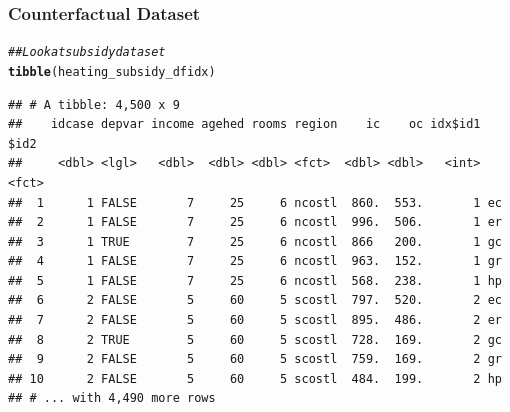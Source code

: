 \documentclass{beamer}\usepackage[]{graphicx}\usepackage[]{color}
\makeatletter
\newcommand{\hlnum}[1]{\textcolor[rgb]{0.686,0.059,0.569}{#1}}%
\newcommand{\hlstr}[1]{\textcolor[rgb]{0.192,0.494,0.8}{#1}}%
\newcommand{\hlcom}[1]{\textcolor[rgb]{0.678,0.584,0.686}{\textit{#1}}}%
\newcommand{\hlopt}[1]{\textcolor[rgb]{0,0,0}{#1}}%
\newcommand{\hlstd}[1]{\textcolor[rgb]{0.345,0.345,0.345}{#1}}%
\newcommand{\hlkwb}[1]{\textcolor[rgb]{0.69,0.353,0.396}{#1}}%
\newcommand{\hlkwc}[1]{\textcolor[rgb]{0.333,0.667,0.333}{#1}}%
\newcommand{\hlkwd}[1]{\textcolor[rgb]{0.737,0.353,0.396}{\textbf{#1}}}%
\newenvironment{kframe}{%
 \def\at@end@of@kframe{}%
 \ifinner\ifhmode%
  \def\at@end@of@kframe{\end{minipage}}%
  \begin{minipage}{\columnwidth}%
 \fi\fi%
 \def\FrameCommand##1{\hskip\@totalleftmargin \hskip-\fboxsep
 \colorbox{shadecolor}{##1}\hskip-\fboxsep
     \hskip-\linewidth \hskip-\@totalleftmargin \hskip\columnwidth}%
 \MakeFramed {\advance\hsize-\width
   \@totalleftmargin\z@ \linewidth\hsize
   \@setminipage}}%
 {\par\unskip\endMakeFramed%
 \at@end@of@kframe}
\newenvironment{knitrout}{}{} %
\makeatother
\begin{document}

\begin{frame}[fragile]\frametitle{Counterfactual Dataset}
\begin{knitrout}\footnotesize
{}\color{fgcolor}\begin{kframe}
\begin{alltt}
\hlcom{## Look at subsidy dataset}
\hlkwd{tibble}\hlstd{(heating_subsidy_dfidx)}
\end{alltt}
\begin{verbatim}
## # A tibble: 4,500 x 9
##    idcase depvar income agehed rooms region    ic    oc idx$id1 $id2 
##     <dbl> <lgl>   <dbl>  <dbl> <dbl> <fct>  <dbl> <dbl>   <int> <fct>
##  1      1 FALSE       7     25     6 ncostl  860.  553.       1 ec   
##  2      1 FALSE       7     25     6 ncostl  996.  506.       1 er   
##  3      1 TRUE        7     25     6 ncostl  866   200.       1 gc   
##  4      1 FALSE       7     25     6 ncostl  963.  152.       1 gr   
##  5      1 FALSE       7     25     6 ncostl  568.  238.       1 hp   
##  6      2 FALSE       5     60     5 scostl  797.  520.       2 ec   
##  7      2 FALSE       5     60     5 scostl  895.  486.       2 er   
##  8      2 TRUE        5     60     5 scostl  728.  169.       2 gc   
##  9      2 FALSE       5     60     5 scostl  759.  169.       2 gr   
## 10      2 FALSE       5     60     5 scostl  484.  199.       2 hp   
## # ... with 4,490 more rows
\end{verbatim}
\end{kframe}
\end{knitrout}
\end{frame}
\end{document}
